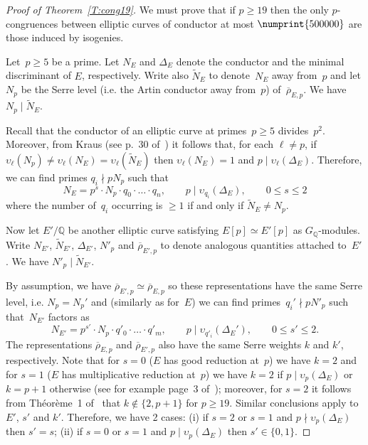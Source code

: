 \documentclass[twoside,leqno,symbols-for-thanks, draft]{rmi}
\numberwithin{equation}{section}
\newcommand{\Q}{\mathbb{Q}}
\newcommand{\rhobar}{{\overline{\rho}}}
\newcommand{\vv}{\upsilon}
\theoremstyle{remark}
\begin{document}
\begin{proof}[Proof of Theorem~\ref{T:cong19}]
We must prove that if $p\ge19$ then the only $p$-congruences between
elliptic curves of conductor at most $\numprint{500000}$ are those
induced by isogenies.

Let~$p \geq 5$ be a prime. Let $N_E$ and $\Delta_E$ denote the
conductor and the minimal discriminant of $E$, respectively. Write
also $\tilde{N}_E$ to denote~$N_E$ away from~$p$ and let $N_p$ be the
Serre level (i.e. the Artin conductor away from~$p$)
of~$\rhobar_{E,p}$.  We have $N_p \mid \tilde{N}_E$.

Recall that the conductor of an elliptic curve at primes~$p \geq 5$
divides~$p^2$. Moreover, from Kraus (see p.~30 of~\cite{KrausThesis})
it follows that, for each $\ell \neq p$, if $\vv_{\ell}(N_p) \neq
\vv_{\ell}(N_E) = \vv_{\ell}(\tilde{N}_E)$ then $\vv_{\ell}(N_E) = 1$
and $p \mid \vv_{\ell}(\Delta_E)$.  Therefore, we can find primes $q_i
\nmid pN_p$ such that
\begin{equation}\label{E:condE}
  N_E = p^s \cdot N_p \cdot q_0 \cdot \ldots \cdot q_n, 
 \qquad p \mid \vv_{q_i}(\Delta_E), \qquad 0 \leq s \leq 2
\end{equation}
where the number of~$q_i$ occurring is $\geq 1$ if and only if 
$\tilde{N}_E \neq N_p$. 

Now let $E'/\Q$ be another elliptic curve satisfying $E[p] \simeq E'[p]$ as $G_\Q$-modules. Write $N_{E'}$, $\tilde{N}_{E'}$, $\Delta_{E'}$, $N'_p$ and $\rhobar_{E',p}$ to denote analogous quantities attached to~$E'$. We have $N'_p \mid \tilde{N}_{E'}$.

By assumption, we have $\rhobar_{E',p} \simeq \rhobar_{E,p}$ so these representations have the same Serre level, i.e. $N_p = N_p'$ and (similarly as for~$E$) we can find primes~$q_i' \nmid pN'_p$ such that~$N_{E'}$ factors as
\begin{equation}\label{E:condE'}
 N_{E'} = p^{s'} \cdot N_p \cdot q'_0 \cdot \ldots \cdot q'_m, 
 \qquad p \mid \vv_{q'_i}(\Delta_E'),
 \qquad 0 \leq s' \leq 2.
\end{equation}
The representations $\rhobar_{E,p}$ and $\rhobar_{E',p}$ also have the
same Serre weights $k$ and $k'$, respectively. Note that for $s=0$
($E$ has good reduction at~$p$) we have $k=2$ and for $s=1$ ($E$ has
multiplicative reduction at~$p$) we have $k=2$ if $p \mid
\vv_p(\Delta_E)$ or $k=p+1$ otherwise (see for example page~3
of~\cite{KrausThesis}); moreover, for $s=2$ it follows from
Th\'eor\`eme~1 of~\cite{KrausThesis} that $k \not\in \{2, p+1\}$ for
$p \geq 19$. Similar conclusions apply to $E'$, $s'$ and $k'$.
Therefore, we have 2 cases: (i) if $s = 2$ or $s=1$ and $p \nmid
\vv_{p}(\Delta_E)$ then $s'=s$; (ii) if $s=0$ or $s=1$ and $p \mid
\vv_{p}(\Delta_E)$ then $s' \in \{0,1 \}$.


\end{proof}
\end{document}
